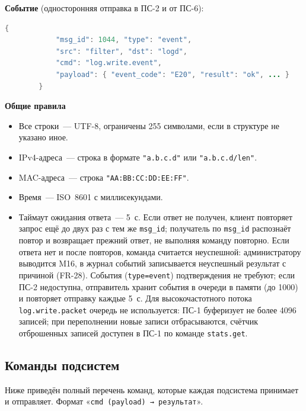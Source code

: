 \documentclass[13pt,a4paper,final]{article}
\begin{document}
	\textbf{Событие} (односторонняя отправка в ПС-2 и от ПС-6):
	
	\begin{lstlisting}[language=Java, caption={Событие}, label={lst:event}]
		{
			"msg_id": 1044, "type": "event",
			"src": "filter", "dst": "logd",
			"cmd": "log.write.event",
			"payload": { "event_code": "E20", "result": "ok", ... }
		}
	\end{lstlisting}
	
	\textbf{Общие правила}
	\begin{itemize}
		\item Все строки~--- UTF-8, ограничены 255 символами, если в структуре не указано иное.
		\item IPv4-адреса~--- строка в формате \texttt{"a.b.c.d"} или \texttt{"a.b.c.d/len"}.
		\item MAC-адреса~--- строка \texttt{"AA:BB:CC:DD:EE:FF"}.
		\item Время~--- ISO~8601 с миллисекундами.
		\item Таймаут ожидания ответа~--- 5~с. Если ответ не получен, клиент повторяет запрос ещё до двух раз с тем же \texttt{msg\_id}; получатель по \texttt{msg\_id} распознаёт повтор и возвращает прежний ответ, не выполняя команду повторно. Если ответа нет и после повторов, команда считается неуспешной: администратору выводится M16, в журнал событий записывается неуспешный результат с причиной (FR-28). События (\texttt{type=event}) подтверждения не требуют; если ПС-2 недоступна, отправитель хранит события в очереди в памяти (до 1000) и повторяет отправку каждые 5~с. {Для высокочастотного потока \texttt{log.write.packet} очередь не используется: ПС-1 буферизует не более 4096 записей; при переполнении новые записи отбрасываются, счётчик отброшенных записей доступен в ПС-1 по команде \texttt{stats.get}.}
	\end{itemize}
	
	\subsection{Команды подсистем}
	
	Ниже приведён полный перечень команд, которые каждая подсистема принимает и отправляет. Формат «\texttt{cmd (payload) → результат}».
\end{document}
